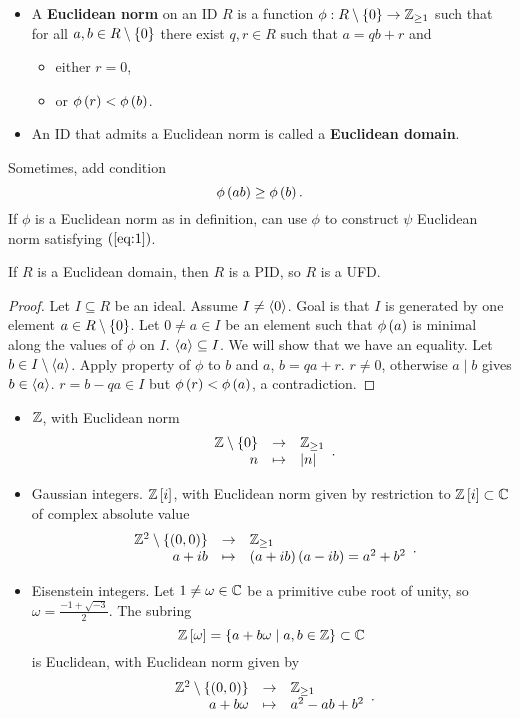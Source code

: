 \begin{definition}
\hfill
\begin{itemize}
\item A \textbf{Euclidean norm} on an ID $ R $ is a function $ \phi : R \setminus \left\{ 0 \right\} \to \mathbb{Z}_{\ge 1} $ such that for all $ a, b \in R \setminus \left\{ 0 \right\} $ there exist $ q, r \in R $ such that $ a = qb + r $ and
\begin{itemize}
\item either $ r = 0 $,
\item or $ \phi\left( r \right) < \phi\left( b \right) $.
\end{itemize}
\item An ID that admits a Euclidean norm is called a \textbf{Euclidean domain}.
\end{itemize}
\end{definition}

Sometimes, add condition
\begin{equation}
\label{eq:1}
\phi\left( ab \right) \ge \phi\left( b \right).
\end{equation}
If $ \phi $ is a Euclidean norm as in definition, can use $ \phi $ to construct $ \psi $ Euclidean norm satisfying $ \left( \ref{eq:1} \right) $.

\begin{theorem}
If $ R $ is a Euclidean domain, then $ R $ is a PID, so $ R $ is a UFD.
\end{theorem}


\begin{proof}
Let $ I \subseteq R $ be an ideal. Assume $ I \ne \left\langle 0 \right\rangle $. Goal is that $ I $ is generated by one element $ a \in R \setminus \left\{ 0 \right\} $. Let $ 0 \ne a \in I $ be an element such that $ \phi\left( a \right) $ is minimal along the values of $ \phi $ on $ I $. $ \left\langle a \right\rangle \subseteq I $. We will show that we have an equality. Let $ b \in I \setminus \left\langle a \right\rangle $. Apply property of $ \phi $ to $ b $ and $ a $, $ b = qa + r $. $ r \ne 0 $, otherwise $ a \mid b $ gives $ b \in \left\langle a \right\rangle $. $ r = b - qa \in I $ but $ \phi\left( r \right) < \phi\left( a \right) $, a contradiction.
\end{proof}

\begin{example*}
\hfill
\begin{itemize}
\item $ \mathbb{Z} $, with Euclidean norm
$$ \function{\Z \setminus \cb{0}}{\Z_{\ge 1}}{n}{\abs{n}}. $$
\item Gaussian integers. $ \mathbb{Z}\left[ i \right] $, with Euclidean norm given by restriction to $ \mathbb{Z}\left[ i \right] \subset \mathbb{C} $ of complex absolute value
$$ \function{\Z^2 \setminus \cb{\rb{0, 0}}}{\Z_{\ge 1}}{a + ib}{\rb{a + ib}\rb{a - ib} = a^2 + b^2}. $$
\item Eisenstein integers. Let $ 1 \ne \omega \in \mathbb{C} $ be a primitive cube root of unity, so $ \omega = \tfrac{-1 + \sqrt{-3}}{2} $. The subring
$$ \mathbb{Z}\left[ \omega \right] = \left\{ a + b\omega \mid a, b \in \mathbb{Z} \right\} \subset \mathbb{C} $$
is Euclidean, with Euclidean norm given by
$$ \function{\Z^2 \setminus \cb{\rb{0, 0}}}{\Z_{\ge 1}}{a + b\omega}{a^2 - ab + b^2}. $$
\end{itemize}
\end{example*}

